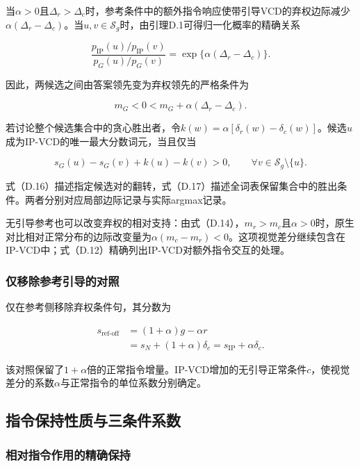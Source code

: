 当\(\alpha>0\)且\(\Delta_r>\Delta_c\)时，参考条件中的额外指令响应使带引导VCD的弃权边际减少\(\alpha(\Delta_r-\Delta_c)\)。当\(u,v\in\mathcal S_g\)时，由引理D.1可得归一化概率的精确关系

\[
\frac{p_{\mathrm{IP}}(u)/p_{\mathrm{IP}}(v)}{p_G(u)/p_G(v)}
=\exp\{\alpha(\Delta_r-\Delta_c)\}.
\tag{D.15}
\]

因此，两候选之间由答案领先变为弃权领先的严格条件为

\[
m_G<0<m_G+\alpha(\Delta_r-\Delta_c).
\tag{D.16}
\]

若讨论整个候选集合中的贪心胜出者，令\(k(w)=\alpha[\delta_r(w)-\delta_c(w)]\)。候选\(u\)成为IP-VCD的唯一最大分数词元，当且仅当

\[
s_G(u)-s_G(v)+k(u)-k(v)>0,
\qquad\forall v\in\mathcal S_g\setminus\{u\}.
\tag{D.17}
\]

式（D.16）描述指定候选对的翻转，式（D.17）描述全词表保留集合中的胜出条件。两者分别对应局部边际记录与实际argmax记录。

无引导参考也可以改变弃权的相对支持：由式（D.14），\(m_r>m_c\)且\(\alpha>0\)时，原生对比相对正常分布的边际改变量为\(\alpha(m_c-m_r)<0\)。这项视觉差分继续包含在IP-VCD中；式（D.12）精确列出IP-VCD对额外指令交互的处理。

\subsubsection{仅移除参考引导的对照}\label{ux4ec5ux79fbux9664ux53c2ux8003ux5f15ux5bfcux7684ux5bf9ux7167}

仅在参考侧移除弃权条件句，其分数为

\[
\begin{aligned}
s_{\mathrm{ref\text{-}off}}
&=(1+\alpha)g-\alpha r\\
&=s_N+(1+\alpha)\delta_c
=s_{\mathrm{IP}}+\alpha\delta_c.
\end{aligned}
\tag{D.18}
\]

该对照保留了\(1+\alpha\)倍的正常指令增量。IP-VCD增加的无引导正常条件\(c\)，使视觉差分的系数\(\alpha\)与正常指令的单位系数分别确定。

\subsection{指令保持性质与三条件系数}\label{ux6307ux4ee4ux4fddux6301ux6027ux8d28ux4e0eux4e09ux6761ux4ef6ux7cfbux6570}

\subsubsection{相对指令作用的精确保持}\label{ux76f8ux5bf9ux6307ux4ee4ux4f5cux7528ux7684ux7cbeux786eux4fddux6301}

